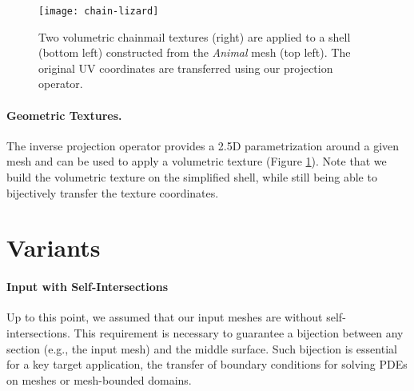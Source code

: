 

\begin{figure}
    \centering
    \texttt{[image: chain-lizard]}
    \caption{Two volumetric chainmail textures (right) are applied to a shell (bottom left) constructed from the \emph{Animal} mesh (top left).
    The original UV coordinates are transferred using our projection operator.}
    \label{fig:volumetric-textures}
    
\end{figure}
\paragraph{Geometric Textures.}
The inverse projection operator provides a 2.5D parametrization around a given mesh and can be used to apply a volumetric texture (Figure \ref{fig:volumetric-textures}).
Note that we build the volumetric texture on the simplified shell, while still being able to bijectively transfer the texture coordinates.






\section{Variants}\label{sec:variants}


\paragraph{Input with Self-Intersections}
Up to this point, we assumed that our input meshes are without self-intersections. This requirement is necessary to guarantee a bijection between any section (e.g., the input mesh) and the middle surface. Such bijection is essential for a key target application, the transfer of boundary conditions for solving PDEs on meshes or mesh-bounded domains. 

